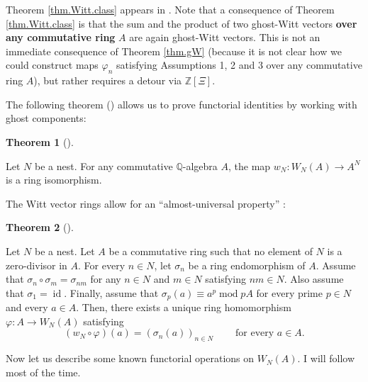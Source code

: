 \documentclass[numbers=enddot,12pt,final,onecolumn,notitlepage]{scrartcl}%
\theoremstyle{definition}
\newtheorem{theo}{Theorem}[section]
\newenvironment{theorem}[1][]
{\begin{theo}[#1]\begin{leftbar}}
{\end{leftbar}\end{theo}}
\begin{document}
Theorem \ref{thm.Witt.class} appears in \cite[Theorem 2.6]{rabinoff-witt}.
Note that a consequence of Theorem \ref{thm.Witt.class} is that the sum and
the product of two ghost-Witt vectors \textbf{over any commutative ring }$A$
are again ghost-Witt vectors. This is not an immediate consequence of Theorem
\ref{thm.gW} (because it is not clear how we could construct maps $\varphi
_{n}$ satisfying Assumptions 1, 2 and 3 over any commutative ring $A$), but
rather requires a detour via $\mathbb{Z}\left[  \Xi\right]  $.

The following theorem (\cite[Remark 2.9, part 3]{rabinoff-witt}) allows us to
prove functorial identities by working with ghost components:

\begin{theorem}
\label{thm.Witt.iso}Let $N$ be a nest. For any commutative $\mathbb{Q}%
$-algebra $A$, the map $w_{N}:W_{N}\left(  A\right)  \rightarrow A^{N}$ is a
ring isomorphism.
\end{theorem}

The Witt vector rings allow for an ``almost-universal property'' \cite[Theorem
6.1]{rabinoff-witt}:

\begin{theorem}
\label{thm.Witt.frob.au}Let $N$ be a nest. Let $A$ be a commutative ring such
that no element of $N$ is a zero-divisor in $A$. For every $n\in N$, let
$\sigma_{n}$ be a ring endomorphism of $A$. Assume that $\sigma_{n}\circ
\sigma_{m}=\sigma_{nm}$ for any $n\in N$ and $m\in N$ satisfying $nm\in N$.
Also assume that $\sigma_{1}=\operatorname*{id}$. Finally, assume that
$\sigma_{p}\left(  a\right)  \equiv a^{p}\operatorname{mod}pA$ for every prime
$p\in N$ and every $a\in A$. Then, there exists a unique ring homomorphism
$\varphi:A\rightarrow W_{N}\left(  A\right)  $ satisfying%
\[
\left(  w_{N}\circ\varphi\right)  \left(  a\right)  =\left(  \sigma_{n}\left(
a\right)  \right)  _{n\in N}\ \ \ \ \ \ \ \ \ \ \text{for every }a\in A.
\]

\end{theorem}

Now let us describe some known functorial operations on $W_{N}\left(
A\right)  $. I will follow \cite{rabinoff-witt} most of the time.
\end{document}
